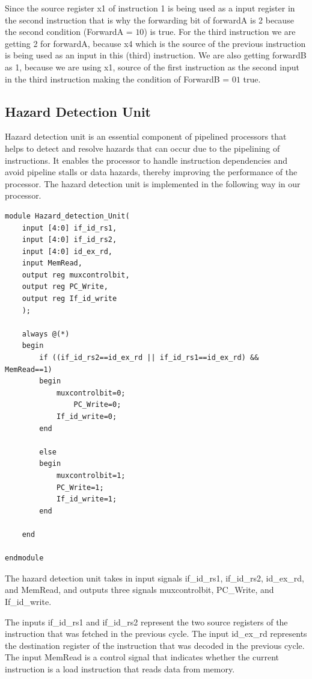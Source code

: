\documentclass{article}
\begin{document}
Since the source register x1 of instruction 1 is being used as a input register in the second instruction that is why the forwarding bit of forwardA is 2 because the second condition (ForwardA = $10$) is true. For the third instruction we are getting 2 for forwardA, because x4 which is the source of the previous instruction is being used as an input in this (third) instruction. We are also getting forwardB as 1, because we are using x1, source of the first instruction as the second input in the third instruction making the condition of ForwardB = $01$ true.

\subsection{Hazard Detection Unit}
Hazard detection unit is an essential component of pipelined processors that helps to detect and resolve hazards that can occur due to the pipelining of instructions. It enables the processor to handle instruction dependencies and avoid pipeline stalls or data hazards, thereby improving the performance of the processor. The hazard detection unit is implemented in the following way in our processor.

\begin{lstlisting}[caption={Hazard Detection Unit}, captionpos=b, language=RISC-V]
module Hazard_detection_Unit(
    input [4:0] if_id_rs1,
    input [4:0] if_id_rs2,
    input [4:0] id_ex_rd,
    input MemRead,
    output reg muxcontrolbit,
    output reg PC_Write,
    output reg If_id_write
    );
    
    always @(*)    
    begin 
        if ((if_id_rs2==id_ex_rd || if_id_rs1==id_ex_rd) &&  MemRead==1)
        begin
            muxcontrolbit=0;
                PC_Write=0;         
            If_id_write=0;
        end
        
        else 
        begin
            muxcontrolbit=1;
            PC_Write=1;
            If_id_write=1;
        end 
        
    end 
    
endmodule
\end{lstlisting}

The hazard detection unit takes in input signals if\_id\_rs1, if\_id\_rs2, id\_ex\_rd, and MemRead, and outputs three signals muxcontrolbit, PC\_Write, and If\_id\_write.

The inputs if\_id\_rs1 and if\_id\_rs2 represent the two source registers of the instruction that was fetched in the previous cycle. The input id\_ex\_rd represents the destination register of the instruction that was decoded in the previous cycle. The input MemRead is a control signal that indicates whether the current instruction is a load instruction that reads data from memory.
\end{document}
